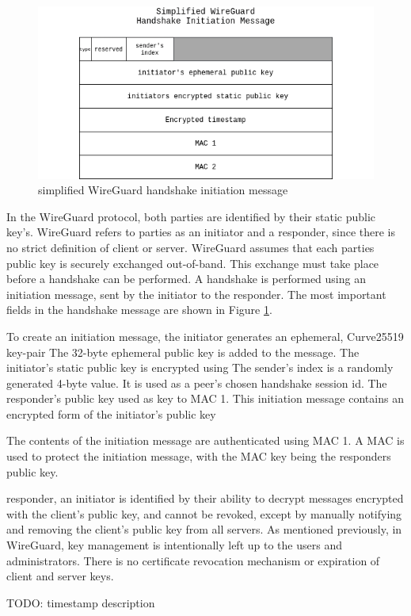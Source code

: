 \documentclass [11pt, proquest] {uwthesis}[2020/02/24]
\begin{document}
\begin{figure}[ht]
\includegraphics[width=12cm]{paper/images/Wg_hand_init.drawio.png}
\caption{simplified WireGuard handshake initiation message}
\label{fig:hand_init}
\end{figure}
In the WireGuard protocol, both parties are identified by their static public key's. WireGuard refers to parties as an initiator and a responder, since there is no strict definition of client or server. WireGuard assumes that each parties public key is securely exchanged out-of-band. This exchange must take place before a handshake can be performed. A handshake is performed using an initiation message, sent by the initiator to the responder. The most important fields in the handshake message are shown in Figure \ref{fig:hand_init}.

To create an initiation message, the initiator generates an ephemeral, Curve25519 key-pair The 32-byte ephemeral public key is added to the message. The initiator's static public key is encrypted using 
The sender's index is a randomly generated 4-byte value. It is used as a peer's chosen handshake session id.
The responder's public key used as key to MAC 1. This initiation message contains an encrypted form of the initiator's public key

The contents of the initiation message are authenticated using MAC 1.
A MAC is used to protect the initiation message, with the MAC key being the responders public key.

responder, an initiator is identified by their ability to decrypt messages encrypted with the client's public key, and cannot be revoked, except by manually notifying and removing the client’s public key from all servers. As mentioned previously, in WireGuard, key management is intentionally left up to the users and administrators. There is no certificate revocation mechanism or expiration of client and server keys.

TODO: timestamp description
\end{document}
